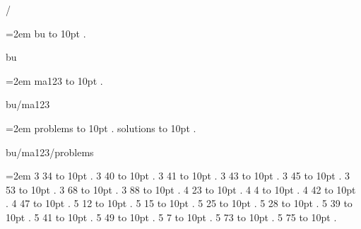 
\parindent=0pt
\pdfpagewidth=148mm
\pdfpageheight=210mm
\hsize=128mm
\vsize=190mm
\pdfhorigin=0pt
\pdfvorigin=0pt
\hoffset=10mm
\voffset=10mm
/
\par\begingroup
\leftskip=2em
\smallskip
bu \leaders\hbox to 10pt {\hss.\hss}  \hfill {}
\smallskip
\medskip
\par\endgroup
\bigskip
{}
bu
\par\begingroup
\leftskip=2em
\smallskip
ma123 \leaders\hbox to 10pt {\hss.\hss}  \hfill {}
\smallskip
\medskip
\par\endgroup
\bigskip
{}
bu/ma123
\par\begingroup
\leftskip=2em
\smallskip
problems \leaders\hbox to 10pt {\hss.\hss}  \hfill {}
\smallskip
solutions \leaders\hbox to 10pt {\hss.\hss}  \hfill {}
\smallskip
\medskip
\par\endgroup
\bigskip
{}
bu/ma123/problems
\par\begingroup
\leftskip=2em
\smallskip
{} 3 34 \leaders\hbox to 10pt {\hss.\hss}  \hfill {}
 3 40 \leaders\hbox to 10pt {\hss.\hss}  \hfill {}
 3 41 \leaders\hbox to 10pt {\hss.\hss}  \hfill {}
 3 43 \leaders\hbox to 10pt {\hss.\hss}  \hfill {}
 3 45 \leaders\hbox to 10pt {\hss.\hss}  \hfill {}
 3 53 \leaders\hbox to 10pt {\hss.\hss}  \hfill {}
 3 68 \leaders\hbox to 10pt {\hss.\hss}  \hfill {}
 3 88 \leaders\hbox to 10pt {\hss.\hss}  \hfill {}
 4 23 \leaders\hbox to 10pt {\hss.\hss}  \hfill {}
 4 4 \leaders\hbox to 10pt {\hss.\hss}  \hfill {}
 4 42 \leaders\hbox to 10pt {\hss.\hss}  \hfill {}
 4 47 \leaders\hbox to 10pt {\hss.\hss}  \hfill {}
 5 12 \leaders\hbox to 10pt {\hss.\hss}  \hfill {}
 5 15 \leaders\hbox to 10pt {\hss.\hss}  \hfill {}
 5 25 \leaders\hbox to 10pt {\hss.\hss}  \hfill {}
 5 28 \leaders\hbox to 10pt {\hss.\hss}  \hfill {}
 5 39 \leaders\hbox to 10pt {\hss.\hss}  \hfill {}
 5 41 \leaders\hbox to 10pt {\hss.\hss}  \hfill {}
 5 49 \leaders\hbox to 10pt {\hss.\hss}  \hfill {}
 5 7 \leaders\hbox to 10pt {\hss.\hss}  \hfill {}
 5 73 \leaders\hbox to 10pt {\hss.\hss}  \hfill {}
 5 75 \leaders\hbox to 10pt {\hss.\hss}  \hfill {}
